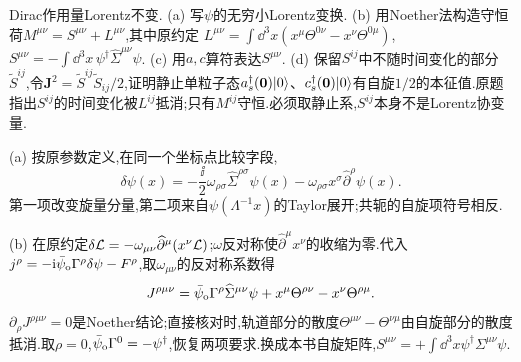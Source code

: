 \begin{exercise}
Dirac作用量Lorentz不变.
(a) 写$\psi$的无穷小Lorentz变换.
(b) 用Noether法构造守恒荷$M^{\mu\nu}=S^{\mu\nu}+L^{\mu\nu}$,其中原约定
$L^{\mu\nu}=\int\dd^3x(x^\mu\Theta^{0\nu}-x^\nu\Theta^{0\mu})$,
$S^{\mu\nu}=-\int\dd^3x\,\psi^\dagger\widehat\Sigma^{\mu\nu}\psi$.
(c) 用$a,c$算符表达$S^{\mu\nu}$.
(d) 保留$S^{ij}$中不随时间变化的部分$\widetilde S^{ij}$,令$\mathbf J^2=\widetilde S^{ij}\widetilde S_{ij}/2$,证明静止单粒子态$a_s^\dagger(\mathbf0)\lvert 0\rangle$、$c_s^\dagger(\mathbf0)\lvert 0\rangle$有自旋$1/2$的本征值.原题指出$S^{ij}$的时间变化被$L^{ij}$抵消;只有$M^{ij}$守恒.必须取静止系,$S^{ij}$本身不是Lorentz协变量.
\end{exercise}
\begin{solution}
(a) 按原参数定义,在同一个坐标点比较字段,
\[
 \delta\psi(x)=-\frac\ii2\omega_{\rho\sigma}\widehat\Sigma^{\rho\sigma}\psi(x)
 -\omega_{\rho\sigma}x^\sigma\widehat\partial^\rho\psi(x).
\]
第一项改变旋量分量,第二项来自$\psi(\Lambda^{-1}x)$的Taylor展开;共轭的自旋项符号相反.

(b) 在原约定$\delta\mathcal L=-\omega_{\mu\nu}\widehat\partial^\mu(x^\nu\mathcal L)$;$\omega$反对称使$\widehat\partial^\mu x^\nu$的收缩为零.代入$j^\rho=-\mathrm i\bar\psi_{\rm o}\Gamma^\rho\delta\psi-F^\rho$,取$\omega_{\mu\nu}$的反对称系数得
\[
 J^{\rho\mu\nu}=\bar\psi_{\rm o}\Gamma^\rho\widehat\Sigma^{\mu\nu}\psi
 +x^\mu\Theta^{\rho\nu}-x^\nu\Theta^{\rho\mu}.
\]
$\partial_\rho J^{\rho\mu\nu}=0$是Noether结论;直接核对时,轨道部分的散度$\Theta^{\mu\nu}-\Theta^{\nu\mu}$由自旋部分的散度抵消.取$\rho=0$,$\bar\psi_{\rm o}\Gamma^0=-\psi^\dagger$,恢复两项要求.换成本书自旋矩阵,$S^{\mu\nu}=+\int\dd^3x\psi^\dagger\Sigma^{\mu\nu}\psi$.


\end{solution}
